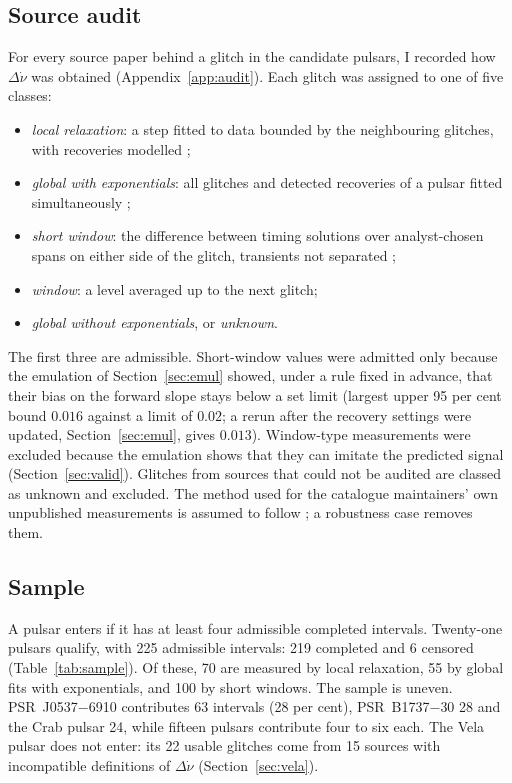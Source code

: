 \documentclass[fleqn,usenatbib]{mnras}
\newcommand{\psr}[1]{PSR~#1}
\begin{document}
\subsection{Source audit}\label{sec:audit}
For every source paper behind a glitch in the candidate pulsars, I recorded
how $\Delta\dot\nu$ was obtained (Appendix~\ref{app:audit}). Each glitch was
assigned to one of five classes:
\begin{itemize}
\item \emph{local relaxation}: a step fitted to data bounded by the
neighbouring glitches, with recoveries modelled
\citep{antonopoulou2018,yu2013,ho2026};
\item \emph{global with exponentials}: all glitches and detected recoveries
of a pulsar fitted simultaneously \citep{basu2022,lower2021,
gugercinoglu2022};
\item \emph{short window}: the difference between timing solutions over
analyst-chosen spans on either side of the glitch, transients not separated
\citep{espinoza2011,wang2000};
\item \emph{window}: a level averaged up to the next glitch;
\item \emph{global without exponentials}, or \emph{unknown}.
\end{itemize}
The first three are admissible. Short-window values were admitted only
because the emulation of Section~\ref{sec:emul} showed, under a rule fixed
in advance, that their bias on the forward slope stays below a set limit
(largest upper 95 per cent bound $0.016$ against a limit of $0.02$; a
rerun after the recovery settings were updated, Section~\ref{sec:emul},
gives $0.013$). Window-type
measurements were excluded because the emulation shows that they can
imitate the predicted signal (Section~\ref{sec:valid}). Glitches from sources
that could not be audited are classed as unknown and excluded. The method used for the catalogue
maintainers' own unpublished measurements is assumed to follow
\citet{basu2022}; a robustness case removes them.

\subsection{Sample}
A pulsar enters if it has at least four admissible completed intervals.
Twenty-one pulsars qualify, with 225 admissible intervals: 219 completed
and 6 censored (Table~\ref{tab:sample}). Of these, 70 are measured by local
relaxation, 55 by global fits with exponentials, and 100 by short windows.
The sample is uneven. \psr{J0537$-$6910} contributes 63 intervals (28 per
cent), \psr{B1737$-$30} 28 and the Crab pulsar 24, while fifteen pulsars
contribute four to six each. The Vela pulsar does not enter: its 22 usable
glitches come from 15 sources with incompatible definitions of
$\Delta\dot\nu$ (Section~\ref{sec:vela}).
\end{document}

